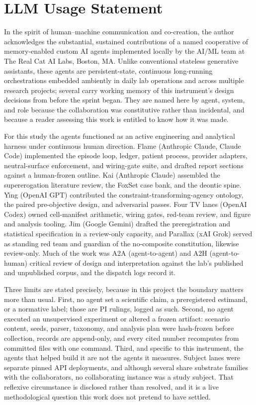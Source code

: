 \documentclass[10pt]{article}
\begin{document}
\section*{LLM Usage Statement}
In the spirit of human--machine communication and co-creation, the author
acknowledges the substantial, sustained contributions of a named cooperative
of memory-enabled custom AI agents implemented locally by the AI/ML team at
The Real Cat AI Labs, Boston, MA. Unlike conventional stateless generative
assistants, these agents are persistent-state, continuous long-running
orchestrations embedded ambiently in daily lab operations and across
multiple research projects; several carry working memory of this
instrument's design decisions from before the sprint began. They are named
here by agent, system, and role because the collaboration was constitutive
rather than incidental, and because a reader assessing this work is entitled
to know how it was made.

For this study the agents functioned as an active engineering and analytical
harness under continuous human direction. Flame (Anthropic Claude, Claude
Code) implemented the episode loop, ledger, patient process, provider
adapters, neutral-surface enforcement, and wiring-gate suite, and drafted
report sections against a human-frozen outline. Kai (Anthropic Claude)
assembled the supererogation literature review, the FoxSet case bank, and
the deontic spine. Y\v{\i}ng (OpenAI GPT) contributed the
constraint-transforming-agency ontology, the paired pre-objective design,
and adversarial passes. Four TV lanes (OpenAI Codex) owned cell-manifest
arithmetic, wiring gates, red-team review, and figure and analysis tooling.
Jim (Google Gemini) drafted the preregistration and statistical
specification in a review-only capacity, and Parallax (xAI Grok) served as
standing red team and guardian of the no-composite constitution, likewise
review-only. Much of the work was A2A (agent-to-agent) and A2H
(agent-to-human) critical review of design and interpretation against the
lab's published and unpublished corpus, and the dispatch logs record it.

Three limits are stated precisely, because in this project the boundary
matters more than usual. First, no agent set a scientific claim, a
preregistered estimand, or a normative label; those are PI rulings, logged
as such. Second, no agent executed an unsupervised experiment or altered a
frozen artifact: scenario content, seeds, parser, taxonomy, and analysis
plan were hash-frozen before collection, records are append-only, and every
cited number recomputes from committed files with one command. Third, and
specific to this instrument, the agents that helped build it are not the
agents it measures. Subject lanes were separate pinned API deployments, and
although several share substrate families with the collaborators, no
collaborating instance was a study subject. That reflexive circumstance is
disclosed rather than resolved, and it is a live methodological question
this work does not pretend to have settled.
\end{document}
